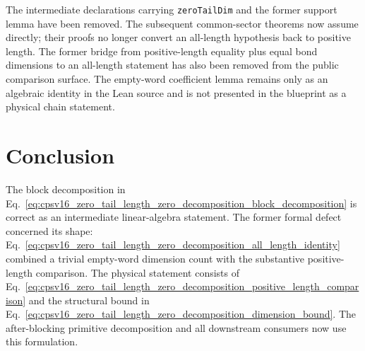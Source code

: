 \documentclass{article}
\begin{document}
The intermediate declarations carrying \texttt{zeroTailDim} and the former
support lemma  have been
removed. The subsequent common-sector theorems now assume
 directly; their proofs no longer convert an all-length
hypothesis back to positive length. The former bridge from positive-length
equality plus equal bond dimensions to an all-length statement has also been
removed from the public comparison surface. The empty-word coefficient lemma
remains only as an algebraic identity in the Lean source and is not presented
in the blueprint as a physical chain statement.

\section{Conclusion}

The block decomposition in
Eq.~\ref{eq:cpsv16_zero_tail_length_zero_decomposition_block_decomposition}
is correct as an intermediate linear-algebra statement. The former formal
defect concerned its shape:
Eq.~\ref{eq:cpsv16_zero_tail_length_zero_decomposition_all_length_identity}
combined a trivial empty-word dimension count with the substantive
positive-length comparison. The physical statement consists of
Eq.~\ref{eq:cpsv16_zero_tail_length_zero_decomposition_positive_length_comparison}
and the structural bound in
Eq.~\ref{eq:cpsv16_zero_tail_length_zero_decomposition_dimension_bound}.
The after-blocking primitive decomposition and all downstream consumers now
use this formulation.



\end{document}
